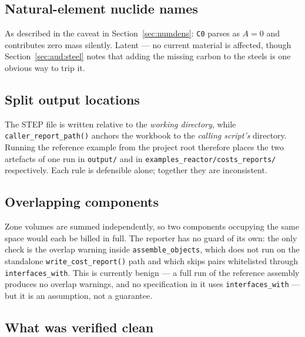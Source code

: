 \documentclass[9pt,a4paper]{extarticle}
\newcommand{\code}[1]{\texttt{\small #1}}
\newcommand{\file}[1]{\texttt{\small #1}}
\begin{document}
\subsection{Natural-element nuclide names}
\label{sec:aud:natural}

As described in the caveat in Section~\ref{sec:numdens}: \code{C0} parses as
$A=0$ and contributes zero mass silently. Latent --- no current material is
affected, though Section~\ref{sec:aud:steel} notes that adding the missing
carbon to the steels is one obvious way to trip it.

\subsection{Split output locations}
\label{sec:aud:paths}

The STEP file is written relative to the \emph{working directory}, while
\code{caller\_report\_path()} anchors the workbook to the \emph{calling script's}
directory. Running the reference example from the project root therefore places
the two artefacts of one run in \file{output/} and in
\file{examples\_reactor/costs\_reports/} respectively. Each rule is defensible
alone; together they are inconsistent.

\subsection{Overlapping components}
\label{sec:aud:overlap}

Zone volumes are summed independently, so two components occupying the same
space would each be billed in full. The reporter has no guard of its own: the
only check is the overlap warning inside \code{assemble\_objects}, which does not
run on the standalone \code{write\_cost\_report()} path and which skips pairs
whitelisted through \code{interfaces\_with}. This is currently benign --- a full
run of the reference assembly produces no overlap warnings, and no specification
in it uses \code{interfaces\_with} --- but it is an assumption, not a guarantee.

\subsection{What was verified clean}
\end{document}
